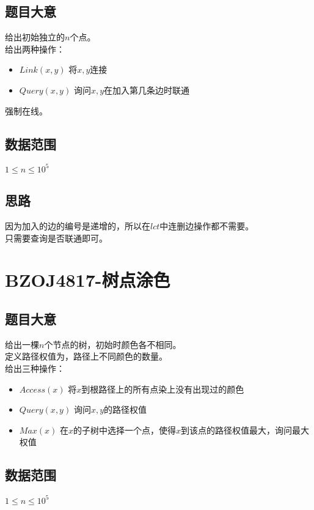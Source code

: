 \documentclass{ctexart}
\numberwithin{equation}{section}
\begin{document}
\begin{flushleft}
  \subsection{题目大意}
  给出初始独立的$n$个点。\\
  给出两种操作：\\
  \begin{itemize}
  \item $Link(x,y)$ 将$x,y$连接
  \item $Query(x,y)$ 询问$x,y$在加入第几条边时联通 
  \end{itemize}
  强制在线。
  \subsection{数据范围}
  $1\le n\le 10^5$
  \subsection{思路}
  因为加入的边的编号是递增的，所以在$lct$中连删边操作都不需要。\\
  只需要查询是否联通即可。\\
  \newpage

  \section{BZOJ4817-树点涂色}
  \subsection{题目大意}
  给出一棵$n$个节点的树，初始时颜色各不相同。\\
  定义路径权值为，路径上不同颜色的数量。\\
  给出三种操作：\\
  \begin{itemize}
  \item $Access(x)$ 将$x$到根路径上的所有点染上没有出现过的颜色
  \item $Query(x,y)$ 询问$x,y$的路径权值
  \item $Max(x)$ 在$x$的子树中选择一个点，使得$x$到该点的路径权值最大，询问最大权值 
  \end{itemize}
  \subsection{数据范围}
  $1\le n\le 10^5$

\end{flushleft}
\end{document}

